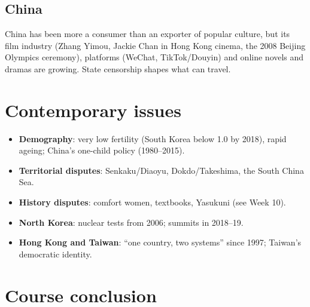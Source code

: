 \subsection{China}

China has been more a consumer than an exporter of popular culture, but its film industry
(Zhang Yimou, Jackie Chan in Hong Kong cinema, the 2008 Beijing Olympics ceremony),
platforms (WeChat, TikTok/Douyin) and online novels and dramas are growing. State
censorship shapes what can travel.

\section{Contemporary issues}

\begin{itemize}
  \item \textbf{Demography}: very low fertility (South Korea below 1.0 by 2018), rapid
        ageing; China's one-child policy (1980--2015).
  \item \textbf{Territorial disputes}: Senkaku/Diaoyu, Dokdo/Takeshima, the South China
        Sea.
  \item \textbf{History disputes}: comfort women, textbooks, Yasukuni (see Week 10).
  \item \textbf{North Korea}: nuclear tests from 2006; summits in 2018--19.
  \item \textbf{Hong Kong and Taiwan}: ``one country, two systems'' since 1997; Taiwan's
        democratic identity.
\end{itemize}

\section{Course conclusion}

\begin{center}
\end{center}


